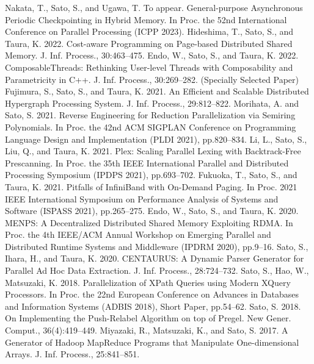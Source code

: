 \documentclass[a4paper,dvipdfmx]{article}
\begin{document}
\newpage
\renewcommand{\refname}{Publications (Refereed)}
\begin{thebibliography}{100}
  Nakata, T., Sato, S., and Ugawa, T. To appear. General-purpose Asynchronous Periodic Checkpointing in Hybrid Memory. In Proc. the 52nd International Conference on Parallel Processing (ICPP 2023).
  Hideshima, T., Sato, S., and Taura, K. 2022. Cost-aware Programming on Page-based Distributed Shared Memory. J. Inf. Process., 30:463–475.
  Endo, W., Sato, S., and Taura, K. 2022. ComposableThreads: Rethinking User-level Threads with Composability and Parametricity in C++. J. Inf. Process., 30:269–282. (Specially Selected Paper)
  Fujimura, S., Sato, S., and Taura, K. 2021. An Efficient and Scalable Distributed Hypergraph Processing System. J. Inf. Process., 29:812–822.
  Morihata, A. and Sato, S. 2021. Reverse Engineering for Reduction Parallelization via Semiring Polynomials. In Proc. the 42nd ACM SIGPLAN Conference on Programming Language Design and Implementation (PLDI 2021), pp.820–834.
  Li, L., Sato, S., Liu, Q., and Taura, K. 2021. Plex: Scaling Parallel Lexing with Backtrack-Free Prescanning. In Proc. the 35th IEEE International Parallel and Distributed Processing Symposium (IPDPS 2021), pp.693–702.
  Fukuoka, T., Sato, S., and Taura, K. 2021. Pitfalls of InfiniBand with On-Demand Paging. In Proc. 2021 IEEE International Symposium on Performance Analysis of Systems and Software (ISPASS 2021), pp.265–275.
  Endo, W., Sato, S., and Taura, K. 2020. MENPS: A Decentralized Distributed Shared Memory Exploiting RDMA. In Proc. the 4th IEEE/ACM Annual Workshop on Emerging Parallel and Distributed Runtime Systems and Middleware (IPDRM 2020), pp.9–16.
  Sato, S., Ihara, H., and Taura, K. 2020. CENTAURUS: A Dynamic Parser Generator for Parallel Ad Hoc Data Extraction. J. Inf. Process., 28:724–732.
  Sato, S., Hao, W., Matsuzaki, K. 2018. Parallelization of XPath Queries using Modern XQuery Processors. In Proc. the 22nd European Conference on Advances in Databases and Information Systems (ADBIS 2018), Short Paper, pp.54–62.
  Sato, S. 2018. On Implementing the Push-Relabel Algorithm on top of Pregel. New Gener. Comput., 36(4):419–449.
  Miyazaki, R., Matsuzaki, K., and Sato, S. 2017. A Generator of Hadoop MapReduce Programs that Manipulate One-dimensional Arrays. J. Inf. Process., 25:841–851.

\end{thebibliography}
\end{document}
